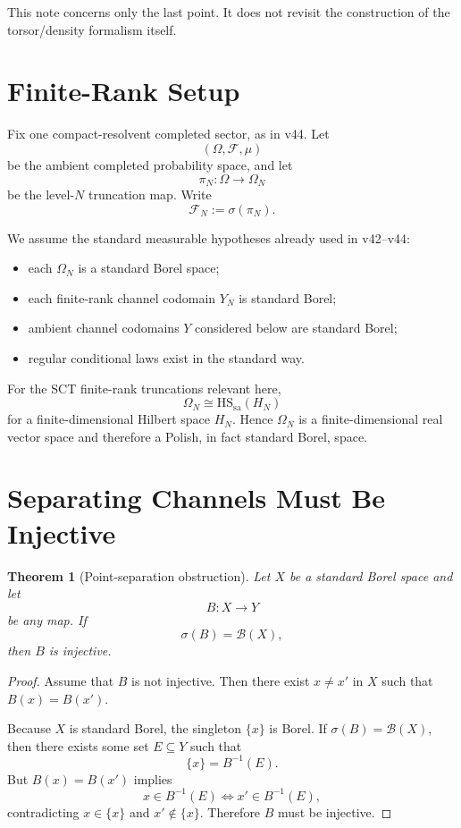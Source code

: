 \documentclass[11pt,a4paper]{article}
\newtheorem{theorem}{Theorem}[section]
\theoremstyle{definition}
\theoremstyle{remark}
\newcommand{\HS}{\mathrm{HS}}
\newcommand{\sa}{\mathrm{sa}}
\newcommand{\cF}{\mathcal F}
\newcommand{\cB}{\mathcal B}
\begin{document}
This note concerns only the last point.  It does not revisit the
construction of the torsor/density formalism itself.

\section{Finite-Rank Setup}

Fix one compact-resolvent completed sector, as in v44.  Let
\[
(\Omega,\cF,\mu)
\]
be the ambient completed probability space, and let
\[
\pi_N:\Omega\to\Omega_N
\]
be the level-$N$ truncation map.  Write
\[
\cF_N:=\sigma(\pi_N).
\]

We assume the standard measurable hypotheses already used in v42--v44:

\begin{itemize}[leftmargin=2em]
  \item each $\Omega_N$ is a standard Borel space;
  \item each finite-rank channel codomain $Y_N$ is standard Borel;
  \item ambient channel codomains $Y$ considered below are standard
        Borel;
  \item regular conditional laws exist in the standard way.
\end{itemize}

For the SCT finite-rank truncations relevant here,
\[
\Omega_N \cong \HS_{\sa}(H_N)
\]
for a finite-dimensional Hilbert space $H_N$.  Hence $\Omega_N$ is a
finite-dimensional real vector space and therefore a Polish, in fact
standard Borel, space.

\section{Separating Channels Must Be Injective}

\begin{theorem}[Point-separation obstruction]
\label{thm:separating-injective}
Let $X$ be a standard Borel space and let
\[
B:X\to Y
\]
be any map.  If
\[
\sigma(B)=\cB(X),
\]
then $B$ is injective.
\end{theorem}

\begin{proof}
Assume that $B$ is not injective.  Then there exist $x\neq x'$ in $X$
such that $B(x)=B(x')$.

Because $X$ is standard Borel, the singleton $\{x\}$ is Borel.  If
$\sigma(B)=\cB(X)$, then there exists some set $E\subseteq Y$ such that
\[
\{x\}=B^{-1}(E).
\]
But $B(x)=B(x')$ implies
\[
x\in B^{-1}(E)\iff x'\in B^{-1}(E),
\]
contradicting $x\in\{x\}$ and $x'\notin\{x\}$.  Therefore $B$ must be
injective.
\end{proof}
\end{document}
